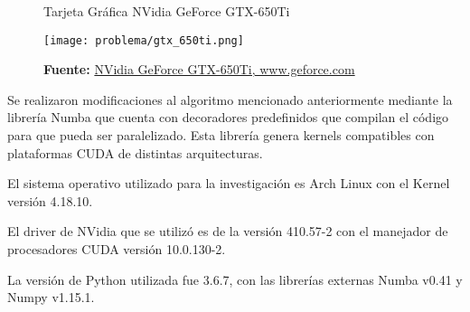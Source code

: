 \documentclass[../main/main.tex]{subfiles}
\begin{document}
  \begin{figure}[H]
    \centering
    \caption{Tarjeta Gráfica NVidia GeForce GTX-650Ti}
    \texttt{[image: problema/gtx\_650ti.png]}
    \caption*{\textbf{Fuente:} \href{https://tinyurl.com/ycr3kouv}{NVidia GeForce GTX-650Ti, www.geforce.com}}
  \end{figure}

  Se realizaron modificaciones al algoritmo mencionado anteriormente mediante la librería Numba que cuenta con decoradores predefinidos que compilan el código para que pueda ser paralelizado. Esta librería genera kernels compatibles con plataformas CUDA de distintas arquitecturas.

  El sistema operativo utilizado para la investigación es Arch Linux con el Kernel versión 4.18.10.

  El driver de NVidia que se utilizó es de la versión 410.57-2 con el manejador de procesadores CUDA versión 10.0.130-2.

  La versión de Python utilizada fue 3.6.7, con las librerías externas Numba v0.41 y Numpy v1.15.1.
\end{document}
